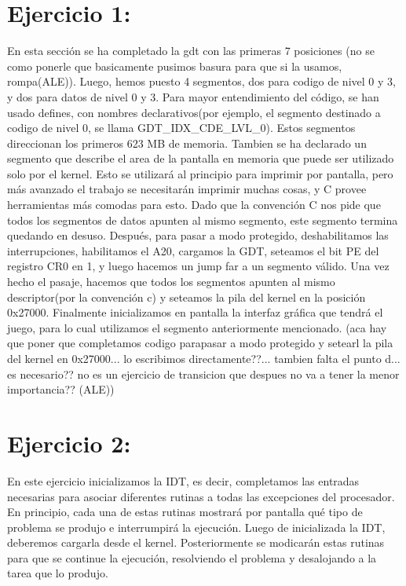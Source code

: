 \documentclass[a4paper]{article}
\begin{document}
\clearpage

\section{Ejercicio 1:}
En esta sección se ha completado la gdt con las primeras 7 posiciones 
(no se como ponerle que basicamente pusimos basura para que si la usamos, rompa(ALE)). Luego, hemos puesto 4 segmentos, dos para codigo de nivel 0 y 3, y dos para datos de nivel 0 y 3. Para mayor entendimiento del código, se han usado defines, con nombres declarativos(por ejemplo, el segmento destinado a codigo de nivel 0, se llama GDT_IDX_CDE_LVL_0). Estos segmentos direccionan los primeros 623 MB de memoria. Tambien se ha declarado un segmento que describe el area de la pantalla en memoria que puede ser utilizado solo por el kernel. Esto se utilizará al principio para imprimir por pantalla, pero más avanzado el trabajo se necesitarán imprimir muchas cosas, y C provee herramientas más comodas para esto. Dado que la convención C nos pide que todos los segmentos de datos apunten al mismo segmento, este segmento termina quedando en desuso. Después, para pasar a modo protegido, deshabilitamos las interrupciones, habilitamos el A20, cargamos la GDT, seteamos el bit PE del registro CR0 en 1, y luego hacemos un jump far a un segmento válido. Una vez hecho el pasaje, hacemos que todos los segmentos apunten al mismo descriptor(por la convención c) y seteamos la pila del kernel en la posición 0x27000. Finalmente inicializamos en pantalla la interfaz gráfica que tendrá el juego, para lo cual utilizamos el segmento anteriormente mencionado. (aca hay que poner que completamos codigo parapasar a modo protegido y setearl la pila del kernel en 0x27000... lo escribimos directamente??... tambien falta el punto d... es necesario?? no es un ejercicio de transicion que despues no va a tener la menor importancia?? (ALE))

%

\clearpage

\section{Ejercicio 2:} 
%

En este ejercicio inicializamos la IDT, es decir, completamos las entradas necesarias para asociar diferentes rutinas a todas las excepciones del procesador. En principio, cada una de estas rutinas mostrará por pantalla qué tipo de problema se produjo e interrumpirá la ejecución. Luego de inicializada la IDT, deberemos cargarla desde el kernel. Posteriormente se modicarán estas rutinas para que se continue la ejecución, resolviendo el problema y desalojando a la tarea que lo produjo.
\end{document}
